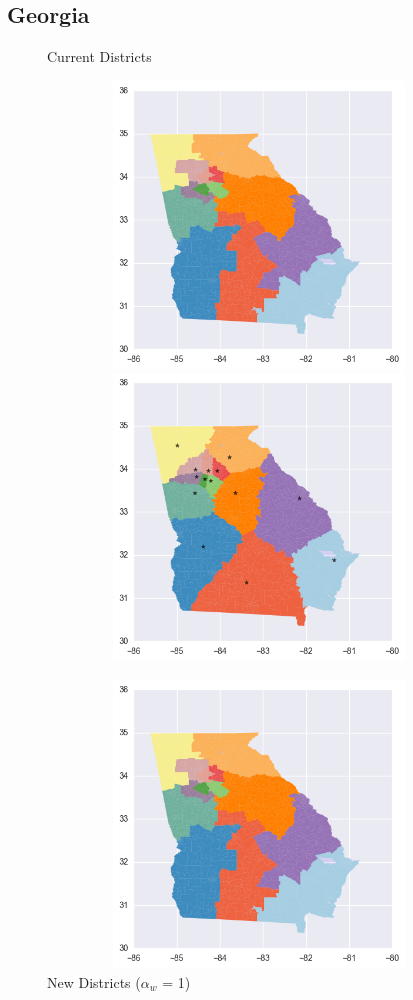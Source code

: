 \clearpage
\newpage

\subsection{Georgia}
\begin{figure}[htb!] \centering
\caption{ Current Districts }
\includegraphics[width=5in,height=3in,keepaspectratio]{../maps/GA/static/before.png}
\includegraphics[width=5in,height=3in,keepaspectratio]{../maps/GA/static/0_0_after.png}
\caption{ New Districts ($\alpha_w$ = 1) }
\includegraphics[width=5in,height=3in,keepaspectratio]{../maps/GA/static/before.png}

\end{figure}
